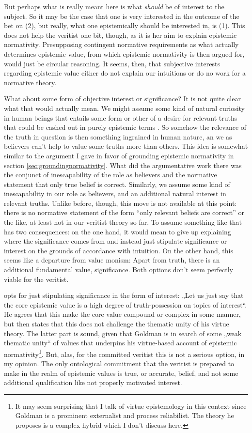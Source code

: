 \documentclass[12pt,numbers=noenddot]{scrartcl}
\begin{document}
But perhaps what is really meant here is what \emph{should} be of interest to the subject. So it may be the case that one is very interested in the outcome of the bet on (2), but really, what one epistemically should be interested in, is (1). This does not help the veritist one bit, though, as it is her aim to explain epistemic normativity. Presupposing contingent normative requirements as what actually determines epistemic value, from which epistemic normativity is then argued for, would just be circular reasoning. It seems, then, that subjective interests regarding epistemic value either do not explain our intuitions or do no work for a normative theory.

What about some form of objective interest or significance? It is not quite clear what that would actually mean. We might assume some kind of natural curiosity in human beings that entails some form or other of a desire for relevant truths that could be cashed out in purely epistemic terms \autocite[333]{Ahlstrom-Vij2013}. So somehow the relevance of the truth in question is then something ingrained in human nature, an we as believers can't help to value some truths more than others. This idea is somewhat similar to the argument I gave in favor of grounding epistemic normativity in section \ref{sec:groundingnormativity}. What did the argumentative work there was the conjunct of inescapability of the role as believers and the normative statement that only true belief is correct. Similarly, we assume some kind of inescapability in our role as believers, and an additional natural interest in relevant truths. Unlike before, though, this move is not available at this point: there is no normative statement of the form “only relevant beliefs are correct” or the like, at least not in our veritist theory so far. To assume something like that has two consequences: on the one hand, it would mean to give up explaining where the significance comes from and instead just stipulate significance or interest on the grounds of accordance with intuition. On the other hand, this seems like a departure from value monism: Apart from truth, there is an additional fundamental value, significance. Both options don't seem perfectly viable for the veritist.

\textcite[61]{Goldman2002-GOLTUO-2} opts for just stipulating significance in the form of interest: „Let us just say that the core epistemic value is a high degree of truth-possession on topics of interest“. He agrees that this make the core value compound or complex in some manner, but then states that this does not challenge the thematic unity of his virtue theory. The latter part is sound, given that Goldman is in search of some „weak thematic unity“ of values that underpins his virtue-based account of epistemic normativity\footnote{It may seem surprising that I talk of virtue epistemology in this context since Goldman is a prominent externalist and process reliabilist. The theory he proposes is a complex hybrid which I don't discuss here.}. But, alas, for the committed veritist this is not a serious option, in my opinion. The only ontological commitment that the veritist is prepared to make in the realm of epistemic values is true, or accurate, belief, and not some additional qualification like not properly motivated interest.
\end{document}
